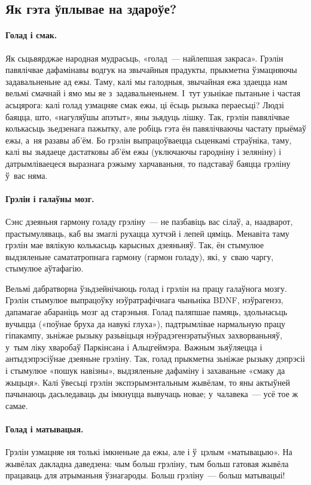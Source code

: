 \subsection{Як гэта ўплывае на здароўе?}

\paragraph{Голад і смак.}
Як сьцьвярджае народная мудрасьць, «голад~--- найлепшая закраса». Грэлін павялічвае дафамінавы водгук на звычайныя прадукты, прыкметна ўзмацняючы задавальненьне ад ежы. Таму, калі мы галодныя, звычайная ежа здаецца нам вельмі смачнай і ямо мы яе з~задавальненьнем. І~тут узьнікае пытаньне і частая асьцярога: калі голад узмацняе смак ежы, ці ёсьць рызыка пераесьці? Людзі баяцца, што, «нагуляўшы апэтыт», яны зьядуць лішку. Так, грэлін павялічвае колькасьць зьедзенага пажытку, але робіць гэта ён павялічваючы частату прыёмаў ежы, а~ня разавы аб'ём. Бо грэлін выпрацоўваецца сьценкамі страўніка, таму, калі вы зьядаеце дастатковы аб'ём ежы (уключаючы гародніну і зеляніну) і датрымліваецеся выразнага рэжыму харчаваньня, то падставаў баяцца грэліну ў~вас няма.

\paragraph{Грэлін і галаўны мозг.}
Сэнс дзеяньня гармону голаду грэліну~--- не пазбавіць вас сілаў, а, наадварот, прастымуляваць, каб вы змаглі рухацца хутчэй і лепей цяміць. Менавіта таму грэлін мае вялікую колькасьць карысных дзеяньняў. Так, ён стымулюе выдзяленьне самататропнага гармону (гармон голаду), які, у~сваю чаргу, стымулюе аўтафагію.

Вельмі дабратворна ўзьдзейнічаюць голад і грэлін на працу галаўнога мозгу. Грэлін стымулюе выпрацоўку нэўратрафічнага чыньніка BDNF, нэўрагенэз, дапамагае абараніць мозг ад старэньня. Голад паляпшае памяць, здольнасьць вучыцца («поўнае бруха да навукі глуха»), падтрымлівае нармальную працу гіпакампу, зьніжае рызыку разьвіцьця нэўрадэгенэратыўных захворваньняў, у~тым ліку хваробаў Паркінсана і Альцгеймэра. Важным зьяўляецца і антыдэпрэсіўнае дзеяньне грэліну. Так, голад прыкметна зьніжае рызыку дэпрэсіі і стымулюе «пошук навізны», выдзяленьне дафаміну і захаваньне «смаку да жыцьця». Калі ўвесьці грэлін экспэрымэнтальным жывёлам, то яны актыўней пачынаюць дасьледаваць ды імкнуцца вывучаць новае; у~чалавека~--- усё тое ж самае.

\paragraph{Голад і матывацыя.}
Грэлін узмацняе ня толькі імкненьне да ежы, але і ў~цэлым «матывацыю». На жывёлах дакладна даведзена: чым больш грэліну, тым больш гатовая жывёла працаваць для атрыманьня ўзнагароды. Больш грэліну~--- больш матывацыі!

